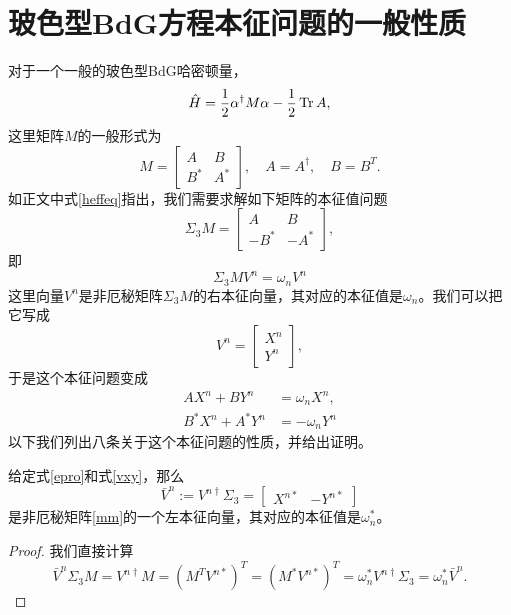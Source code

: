 
\chapter{玻色型BdG方程本征问题的一般性质}\label{bbdgdiscussion}
对于一个一般的玻色型BdG哈密顿量，
\begin{equation}
  \hat H=\frac{1}{2}\alpha^\dagger M\alpha -\frac{1}{2}\Tr A,\label{h}
\end{equation}
这里矩阵$M$的一般形式为
\begin{equation}
  M=\begin{bmatrix}
      A & B\\
      B^* & A^*
  \end{bmatrix},\quad A=A^\dagger, \quad B=B^T.\label{Mdef}
\end{equation}
如正文中式\eqref{heffeq}指出，我们需要求解如下矩阵的本征值问题
\begin{equation}
  \Sigma_3 M=\begin{bmatrix}
      A & B\\
      -B^* & -A^*
  \end{bmatrix},\label{mm}
\end{equation}
即
\begin{equation}
  \Sigma_3 M V^n = \omega_n V^n\label{epro}
\end{equation}
这里向量$V^n$是非厄秘矩阵$\Sigma_3 M$的右本征向量，其对应的本征值是$\omega_n$。我们可以把它写成
\begin{equation}
  V^n = \begin{bmatrix}
      X^n \\
      Y^n
  \end{bmatrix},\label{vxy}
\end{equation}
于是这个本征问题变成
\begin{subequations}
    \begin{align}
        A X^n + B Y^n &= \omega_n X^n,\\
        B^* X^n + A^* Y^n & = -\omega_n Y^n
    \end{align}
\end{subequations}
以下我们列出八条关于这个本征问题的性质，并给出证明。
\begin{proposition}
    给定式\eqref{epro}和式\eqref{vxy}，那么
    \begin{equation}
  \bar V^n := V^{n\dagger}\Sigma_3 = \begin{bmatrix}
      X^{n*} & -Y^{n*}
  \end{bmatrix}
\end{equation}
是非厄秘矩阵\eqref{mm}的一个左本征向量，其对应的本征值是$\omega_n^*$。
\end{proposition}
\begin{proof}
    我们直接计算
    \begin{equation}
  \bar V^n \Sigma_3 M=V^{n\dagger} M = (M^T V^{n*})^T = (M^* V^{n*})^T = \omega^*_n V^{n\dagger} \Sigma_3 = \omega^*_n \bar V^n.
\end{equation}
\end{proof}

